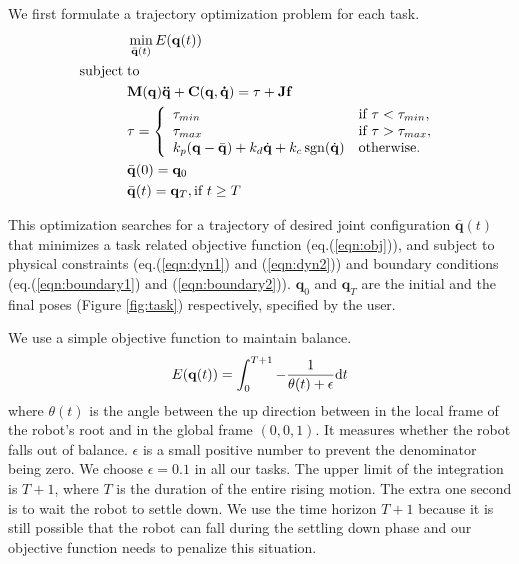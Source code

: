 We first formulate a trajectory optimization problem for each task.
\begin{align}
 \label{eqn:obj}&\min_{\bar{\mathbf{q}}(t)} E(\mathbf{q}(t))\\
\nonumber  \mathrm{subject\;} &\mathrm{to} \\
\label{eqn:dyn1} & \mathbf{M}(\mathbf{q})\mathbf{\ddot{q}}+\mathbf{C}(\mathbf{q},\mathbf{\dot{q}}) =\tau + \mathbf{Jf}\\
\label{eqn:dyn2} &\tau =
  \left\{
    \begin{array}{ll}
      \tau_{min} & \text{if }\tau < \tau_{min},\\
      \tau_{max} & \text{if }\tau > \tau_{max},\\
      k_p(\mathbf{q}-\bar{\mathbf{q}}) + k_d\dot{\mathbf{q}} + k_c\operatorname{sgn}(\dot{\mathbf{q}}) & \text{otherwise.}\\
    \end{array}
  \right.\\
\label{eqn:boundary1}&\bar{\mathbf{q}}(0) = \mathbf{q}_0\\
\label{eqn:boundary2}&\bar{\mathbf{q}}(t) = \mathbf{q}_T, \text{if } t \geq T
\end{align}

This optimization searches for a trajectory of desired joint configuration $\bar{\mathbf{q}}(t)$ that minimizes a task related objective function (eq.(\ref{eqn:obj})), and subject to physical constraints (eq.(\ref{eqn:dyn1}) and (\ref{eqn:dyn2})) and boundary conditions (eq.(\ref{eqn:boundary1}) and (\ref{eqn:boundary2})). $\mathbf{q}_0$ and $\mathbf{q}_T$ are the initial and the final poses (Figure \ref{fig:task}) respectively, specified by the user.

We use a simple objective function to maintain balance.
\begin{displaymath}
E(\mathbf{q}(t))=\int_0^{T+1} -\frac{1}{\theta(t)+\epsilon}\mathrm{d}t\\
\end{displaymath}
where $\theta(t)$ is the angle between the up direction between in the local frame of the robot's root and in the global frame $(0,0,1)$. It measures whether the robot falls out of balance. $\epsilon$ is a small positive number to prevent the denominator being zero. We choose $\epsilon=0.1$ in all our tasks. The upper limit of the integration is $T+1$, where $T$ is the duration of the entire rising motion. The extra one second is to wait the robot to settle down. We use the time horizon $T+1$ because it is still possible that the robot can fall during the settling down phase and our objective function needs to penalize this situation.

